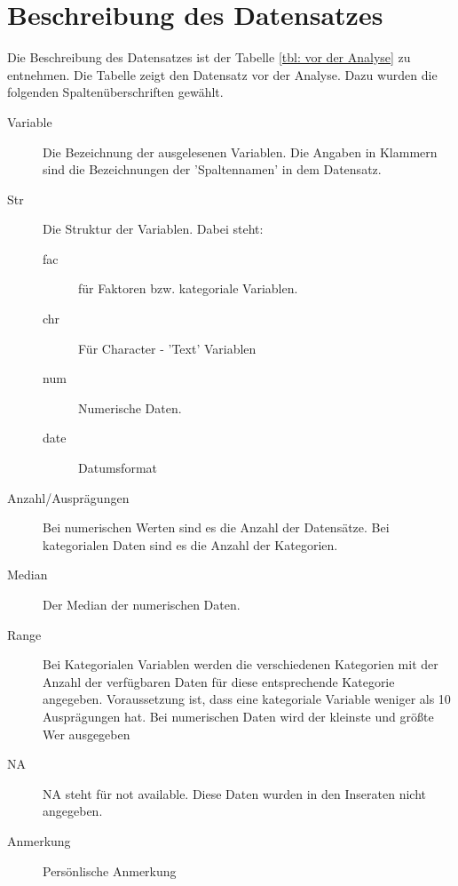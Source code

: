 	\section{Beschreibung des Datensatzes}
	Die Beschreibung des Datensatzes ist der Tabelle \ref{tbl: vor der Analyse} zu entnehmen. Die Tabelle zeigt den Datensatz vor der Analyse. Dazu wurden die folgenden Spaltenüberschriften gewählt. 
	\begin{description}
		\item[Variable] Die Bezeichnung der ausgelesenen Variablen. Die Angaben in Klammern sind die 
		Bezeichnungen der 'Spaltennamen' in dem Datensatz.
		
		\item[Str] Die Struktur der Variablen. Dabei steht:
		\begin{description}
			\item[fac] für Faktoren bzw. kategoriale Variablen.
			
			\item[chr] Für Character - 'Text' Variablen
			
			\item[num] Numerische Daten.
			
			\item[date] Datumsformat
			
			
		\end{description}
		\item[Anzahl/Ausprägungen] Bei numerischen Werten sind es  die Anzahl der Datensätze. Bei kategorialen Daten sind es die Anzahl der Kategorien.
		
		\item[Median] Der Median der numerischen Daten.
		\item[Range] Bei Kategorialen Variablen werden die verschiedenen Kategorien mit der Anzahl der verfügbaren
		Daten für diese entsprechende Kategorie angegeben. Voraussetzung ist, dass eine kategoriale Variable weniger als
		10 Ausprägungen hat. Bei numerischen Daten wird der kleinste und größte Wer ausgegeben
		\item[NA] NA steht für not available. Diese Daten wurden in den Inseraten nicht angegeben.
		\item[Anmerkung] Persönlische Anmerkung
		
	\end{description}

